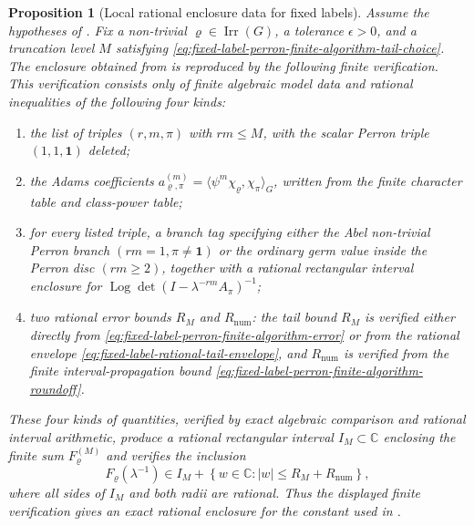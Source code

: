\documentclass[11pt,a4paper]{amsart}
\theoremstyle{plain}
\newtheorem{proposition}[theorem]{Proposition}
\theoremstyle{definition}
\theoremstyle{remark}
\DeclareMathOperator{\Irr}{Irr}
\DeclareMathOperator{\Log}{Log}
\newcommand{\CC}{\mathbb{C}}
\newcommand{\abs}[1]{\lvert #1 \rvert}
\begin{document}
\begin{proposition}[Local rational enclosure data for fixed labels]\label{prop:fixed-label-rational-certificate-record}
\label{prop:fixed-label-finite-io-certificate-summary}
  Assume the hypotheses of .  Fix a
  non-trivial \(\varrho\in\Irr(G)\), a tolerance \(\epsilon>0\), and a
  truncation level \(M\) satisfying
  \eqref{eq:fixed-label-perron-finite-algorithm-tail-choice}.  The enclosure obtained from
   is reproduced by the following
  finite verification.  This verification consists only of finite algebraic model data and
  rational inequalities of the following four kinds:
  \begin{enumerate}[label=\textup{(\roman*)},leftmargin=*]
    \item the list of triples \((r,m,\pi)\) with \(rm\le M\), with the scalar
      Perron triple \((1,1,\mathbf1)\) deleted;
    \item the Adams coefficients \(a_{\varrho,
      \pi}^{(m)}=\langle\psi^m\chi_\varrho,\chi_\pi\rangle_G\), written from
      the finite character table and class-power table;
    \item for every listed triple, a branch tag specifying either the Abel
      non-trivial Perron branch \((rm=1,\pi\ne\mathbf1)\) or the ordinary germ
      value inside the Perron disc \((rm\ge2)\), together with a rational
      rectangular interval enclosure for
      \(\Log\det(I-\lambda^{-rm}A_\pi)^{-1}\);
    \item two rational error bounds \(R_M\) and \(R_{\mathrm{num}}\): the
      tail bound \(R_M\) is verified either directly from
      \eqref{eq:fixed-label-perron-finite-algorithm-error} or from the
      rational envelope \eqref{eq:fixed-label-rational-tail-envelope}, and
      \(R_{\mathrm{num}}\) is verified from the finite interval-propagation
      bound \eqref{eq:fixed-label-perron-finite-algorithm-roundoff}.
  \end{enumerate}
  These four kinds of quantities, verified by exact algebraic comparison
  and rational interval arithmetic, produce a rational rectangular interval
  \(I_M\subset\CC\) enclosing the finite sum \(F_\varrho^{(M)}\) and verifies
  the inclusion
  \begin{equation}\label{eq:fixed-label-certificate-interface-inclusion}
    F_\varrho(\lambda^{-1})
    \in
    I_M+
    \left\{w\in\CC:
      \abs{w}\le R_M+R_{\mathrm{num}}\right\},
  \end{equation}
  where all sides of \(I_M\) and both radii are rational.  Thus the displayed
  finite verification gives an exact rational enclosure for the constant
  used in
  .
\end{proposition}
\end{document}
